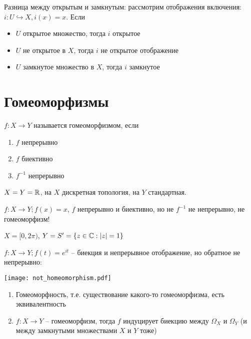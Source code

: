 \documentclass[main]{subfiles}
\begin{document}
\begin{example}
    Разница между открытым и замкнутым:
    рассмотрим отображения включения: $i: U \hookrightarrow X, i(x) = x$.
    Если
    \begin{itemize}
        \item $U$ открытое множество, тогда $i$ открытое
        \item $U$ не открытое в $X$, тогда $i$ не открытое отображение
        \item $U$ замкнутое множество в $X$, тогда $i$ замкнутое
    \end{itemize}
\end{example}

\section{Гомеоморфизмы}

\begin{definition}
    $f: X \to Y$ называется гомеоморфизмом, если
    \begin{enumerate}
        \item $f$ непрерывно
        \item $f$ биективно
        \item $f^{-1}$ непрерывно
    \end{enumerate}
\end{definition}

\begin{example}
    $X=Y=\mathbb{R}$, на $X$ дискретная топология, на $Y$ стандартная.

    $f: X \to Y; f(x)=x$, $f$ непрерывно и биективно, но не $f^{-1}$ не непрерывно, не гомеоморфизм!
\end{example}
\begin{example}
    $X = [0, 2\pi)$, $Y = S' = \{z\in \mathbb{C}: |z| = 1\}$

    $f: X \to Y; f(t) = e^{it}$ -- биекция и непрерывное отображение, но обратное не непрерывно:
    \begin{center}
        \texttt{[image: not\_homeomorphism.pdf]}
    \end{center}
\end{example}

\begin{theorem}
    \begin{enumerate}
        \item Гомеоморфность, т.е. существование какого-то гомеоморфизма, есть эквивалентность
        \item $f:X \to Y$ -- гомеоморфизм, тогда $f$ индуцирует биекцию между $\Omega_X$ и $\Omega_Y$ (и между замкнутыми множествами $X$ и $Y$ тоже)
    \end{enumerate}
\end{theorem}
\end{document}
